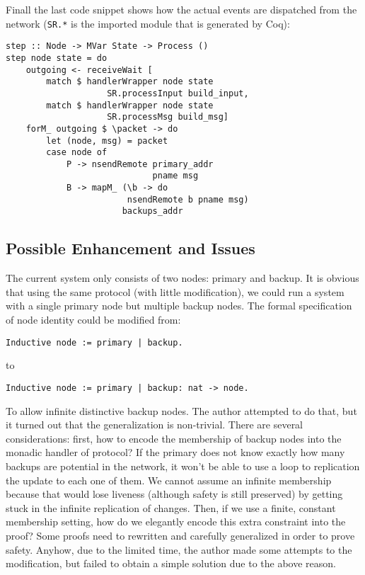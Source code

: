 \documentclass[twocolumn]{article}
\begin{document}
Finall the last code snippet shows how the actual events are dispatched from the
network (\texttt{SR.*} is the imported module that is generated by Coq):
\begin{center}
\small
\begin{verbatim}
step :: Node -> MVar State -> Process ()
step node state = do
    outgoing <- receiveWait [
        match $ handlerWrapper node state
                    SR.processInput build_input,
        match $ handlerWrapper node state
                    SR.processMsg build_msg]
    forM_ outgoing $ \packet -> do
        let (node, msg) = packet
        case node of
            P -> nsendRemote primary_addr
                             pname msg
            B -> mapM_ (\b -> do
                        nsendRemote b pname msg)
                       backups_addr
\end{verbatim}
\end{center}
\subsection{Possible Enhancement and Issues}
The current system only consists of two nodes: primary and backup. It is
obvious that using the same protocol (with little modification), we could run a
system with a single primary node but multiple backup nodes. The formal
specification of node identity could be modified from:
\begin{center}
\small
\begin{verbatim}
Inductive node := primary | backup.
\end{verbatim}
\end{center}
to
\begin{center}
\small
\begin{verbatim}
Inductive node := primary | backup: nat -> node.
\end{verbatim}
\end{center}
To allow infinite distinctive backup nodes. The author attempted to do that,
but it turned out that the generalization is non-trivial. There are several
considerations: first, how to encode the membership of backup nodes into the
monadic handler of protocol? If the primary does not know exactly how many
backups are potential in the network, it won't be able to use a loop to
replication the update to each one of them. We cannot assume an infinite
membership because that would lose liveness (although safety is still
preserved) by getting stuck in the infinite replication of changes. Then, if we
use a finite, constant membership setting, how do we elegantly encode this
extra constraint into the proof? Some proofs need to rewritten and carefully
generalized in order to prove safety. Anyhow, due to the limited time, the
author made some attempts to the modification, but failed to obtain a simple
solution due to the above reason.
\end{document}
